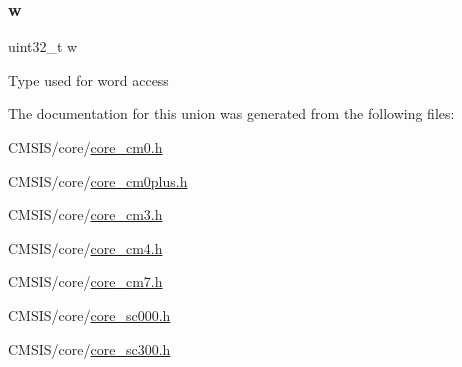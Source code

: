 \subsubsection{\texorpdfstring{w}{w}}
{\footnotesize\ttfamily uint32\+\_\+t w}

Type used for word access 

The documentation for this union was generated from the following files\+:\begin{DoxyCompactItemize}
\item 
C\+M\+S\+I\+S/core/\hyperlink{core__cm0_8h}{core\+\_\+cm0.\+h}\item 
C\+M\+S\+I\+S/core/\hyperlink{core__cm0plus_8h}{core\+\_\+cm0plus.\+h}\item 
C\+M\+S\+I\+S/core/\hyperlink{core__cm3_8h}{core\+\_\+cm3.\+h}\item 
C\+M\+S\+I\+S/core/\hyperlink{core__cm4_8h}{core\+\_\+cm4.\+h}\item 
C\+M\+S\+I\+S/core/\hyperlink{core__cm7_8h}{core\+\_\+cm7.\+h}\item 
C\+M\+S\+I\+S/core/\hyperlink{core__sc000_8h}{core\+\_\+sc000.\+h}\item 
C\+M\+S\+I\+S/core/\hyperlink{core__sc300_8h}{core\+\_\+sc300.\+h}\end{DoxyCompactItemize}
